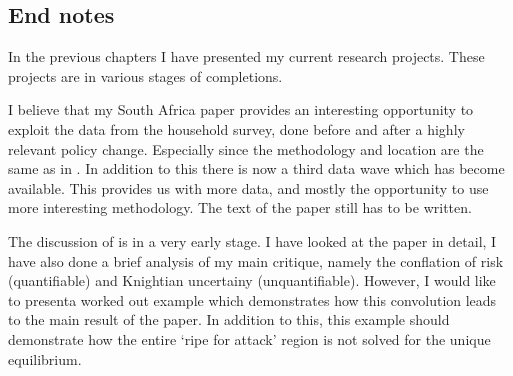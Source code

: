 \documentclass[a4paper]{report}
\begin{document}
\begin{refsection}
\chapter{End notes}
\label{end-notes}
In the previous chapters I have presented my current research projects.
These projects are in various stages of completions.

I believe that my South Africa paper provides an interesting opportunity to exploit the data from the household survey,
done before and after a highly relevant policy change.
Especially since the methodology and location are the same as in \textcite{duflo2000child, duflo2003grandmothers}.
In addition to this there is now a third data wave which has become available.
This provides us with more data, and mostly the opportunity to use more interesting methodology.
The text of the paper still has to be written. 




The discussion of \textcite{morris1998unique} is in a very early stage. I have looked at the paper in detail, I have also done a brief analysis of my main critique, namely the conflation of risk (quantifiable) and Knightian uncertainy (unquantifiable). However, I would like to presenta worked out example which demonstrates how this convolution leads to the main result of the paper. In addition to this, this example should demonstrate how the entire `ripe for attack' region is not solved for the unique equilibrium.


\end{refsection}
\end{document}

